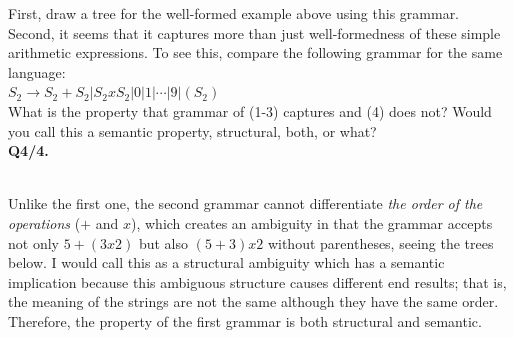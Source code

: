 \documentclass[12pt,a4paper]{article}
\begin{document}
{First, draw a tree for the well-formed example above using this grammar.\\ Second, it seems that it captures more than just well-formedness of these simple arithmetic expressions. To see this, compare the following grammar for the same language: \\

$S_2 \rightarrow S_2 + S_2 |S_2 x S_2 |0|1|\cdots|9|(S_2)$\\

What is the property that grammar of (1-3) captures and (4) does not? Would you call this a semantic property, structural, both, or what?\\

\noindent \textbf{Q4/4.}\\

\\

Unlike the first one, the second grammar cannot differentiate \emph{the order of the operations} ($+$ and $x$), which creates an ambiguity in that the grammar accepts not only $5+(3x2)$ but also $(5+3)x2$ without parentheses, seeing the trees below. I would call this as a structural ambiguity which has a semantic implication because this ambiguous structure causes different end results; that is, the meaning of the strings are not the same although they have the same order. Therefore, the property of the first grammar is both structural and semantic.\\ 


}
\end{document}
